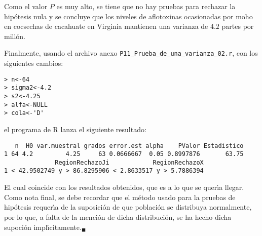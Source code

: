 \begin{solucion}
 \begin{conclusion}
  Como el valor $P$ es muy alto, se tiene que no hay pruebas para rechazar
  la hip\'otesis nula y se concluye que los niveles de aflotoxinas ocasionadas
  por moho en cocsechas de cacahuate en Virginia mantienen una varianza
  de $4.2$ partes por mill\'on.
 \end{conclusion}

 Finalmente, usando el archivo anexo \texttt{P11\_Prueba\_de\_una\_varianza\_02.r}, con los siguientes cambios:
 \begin{verbatim}
> n<-64
> sigma2<-4.2
> s2<-4.25
> alfa<-NULL
> cola<-'D'
 \end{verbatim}
 \vspace{-0.5cm}
 el programa de R lanza el siguiente resultado:
 \begin{verbatim}
   n  H0 var.muestral grados error.est alpha    PValor Estadistico
1 64 4.2         4.25     63 0.0666667  0.05 0.8997876       63.75
              RegionRechazoJi            RegionRechazoX
1 < 42.9502749 y > 86.8295906 < 2.8633517 y > 5.7886394
 \end{verbatim}
 \vspace{-0.5cm}
 El cual coincide con los resultados obtenidos,
 que es a lo que se quer\'{\i}a llegar.
 Como nota final, se debe recordar que el m\'etodo usado para la pruebas
 de hip\'otesis requer\'{\i}a de la suposici\'on de que poblaci\'on se distribuya
 normalmente, por lo que, a falta de la menci\'on de dicha distribuci\'on,
 se ha hecho dicha supoci\'on impl\'{\i}citamente.${}_{\blacksquare}$
\end{solucion}

